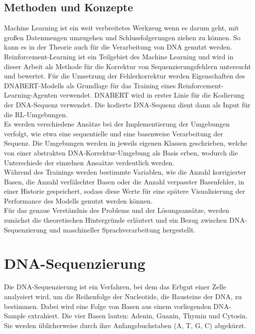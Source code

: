 \documentclass[oneside,bibliography=totocnumbered,BCOR=5mm]{scrbook}%
\theoremstyle{definition}
\theoremstyle{definition}
\theoremstyle{definition}
\theoremstyle{definition}
\theoremstyle{definition}
\theoremstyle{definition}
\begin{document}
\subsection{Methoden und Konzepte}
Machine Learning ist ein weit verbreitetes Werkzeug wenn es darum geht, 
mit großen Datenmengen umzugehen und Schlussfolgerungen ziehen zu können. 
So kann es in der Theorie auch für die Verarbeitung von DNA genutzt werden. \\


Reinforcement-Learning ist ein Teilgebiet des Machine Learning und wird in dieser Arbeit als Methode für 
die Korrektur von Sequenzierungsfehlern untersucht und bewertet.
Für die Umsetzung der Fehlerkorrektur werden Eigenschaften des DNABERT-Modells als Grundlage für das Training eines
Reinforcement-Learning-Agenten verwendet. DNABERT wird in erster Linie für die Kodierung der
DNA-Sequenz verwendet. Die kodierte DNA-Sequenz dient dann als Input für die RL-Umgebungen. \\


Es werden verschiedene Ansätze bei der Implementierung der Umgebungen verfolgt, 
wie etwa eine sequentielle und eine basenweise Verarbeitung der Sequenz. 
Die Umgebungen werden in jeweils eigenen Klassen geschrieben, welche von einer abstrakten
DNA-Korrektur-Umgebung als Basis erben, wodurch die Unterschiede der einzelnen Ansaätze verdeutlich werden.  \\


Während des Trainings werden bestimmte Variablen, wie die Anzahl korrigierter Basen, die Anzahl
verfälschter Basen oder die Anzahl verpasster Basenfehler, in einer Historie gespeichert, 
sodass diese Werte für eine spätere Visualisierung der Performance des Modells genutzt werden können. \\


Für das genaue Verständnis des Problems und der Lösungsansätze, 
werden zunächst die theoretischen Hintergründe erläutert und ein Bezug zwischen DNA-Sequenzierung und maschineller Sprachverarbeitung hergestellt. \\
\linebreak[4]

\section{DNA-Sequenzierung}


Die DNA-Sequenzierung ist ein Verfahren, bei dem das Erbgut einer Zelle analysiert wird, 
um die Reihenfolge der Nucleotide, die Bausteine der DNA, zu bestimmen. 
Dabei wird eine Folge von Basen aus einem vorliegenden DNA-Sample extrahiert.
Die vier Basen lauten: Adenin, Guanin, Thymin und Cytosin. 
Sie werden üblicherweise durch ihre Anfangsbuchstaben (A, T, G, C) abgekürzt. \\
\end{document}
